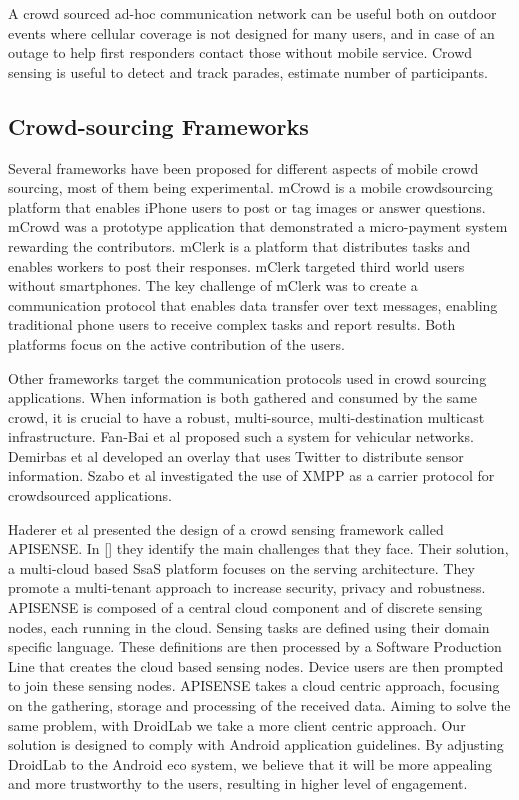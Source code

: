 \documentclass[conference,letterpaper]{IEEEtran}
\begin{document}
A crowd sourced ad-hoc communication network can be useful both on outdoor events where cellular coverage is not designed for many users, and in case of an outage to help first responders contact those without mobile service. Crowd sensing is useful to detect and track parades, estimate number of participants.

\subsection{Crowd-sourcing Frameworks}
Several frameworks have been proposed for different aspects of mobile crowd sourcing, most of them being experimental. mCrowd is a mobile crowdsourcing platform that enables iPhone users to post or tag images or answer questions. mCrowd was a prototype application that demonstrated a micro-payment system rewarding the contributors.
mClerk is a platform that distributes tasks and enables workers to post their responses. mClerk targeted third world users without smartphones. The key challenge of mClerk was to create a communication protocol that enables data transfer over text messages, enabling traditional phone users to receive complex tasks and report results. Both platforms focus on the active contribution of the users.

Other frameworks target the communication protocols used in crowd sourcing applications. When information is both gathered and consumed by the same crowd, it is crucial to have a robust, multi-source, multi-destination multicast infrastructure. Fan-Bai et al proposed such a system for vehicular networks. Demirbas et al developed an overlay that uses Twitter to distribute sensor information. Szabo et al investigated the use of XMPP as a carrier protocol for crowdsourced applications.

Haderer et al presented the design of a crowd sensing framework called APISENSE. 
In [] they identify the main challenges that they face. Their solution, a multi-cloud based SsaS platform focuses on the serving architecture. 
They promote a multi-tenant approach to increase security, privacy and robustness. APISENSE is composed of a central cloud component and of discrete sensing nodes, each running in the cloud. Sensing tasks are defined using their domain specific language. These definitions are then processed by a Software Production Line that creates the cloud based sensing nodes. Device users are then prompted to join these sensing nodes. APISENSE takes a cloud centric approach, focusing on the gathering, storage and processing of the received data. Aiming to solve the same problem, with DroidLab we take a more client centric approach. 
Our solution is designed to comply with Android application guidelines. By adjusting DroidLab to the Android eco system, we believe that it will be more appealing and more trustworthy to the users, resulting in higher level of engagement.
\end{document}
